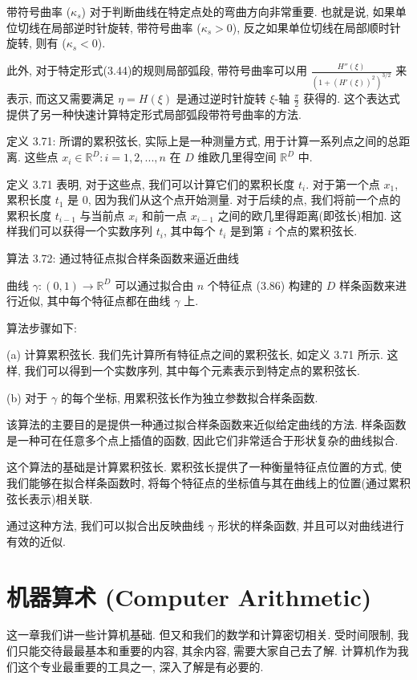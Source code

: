 \documentclass[a4paper]{ctexart}
\begin{document}
{带符号曲率 ($\kappa_s$) 对于判断曲线在特定点处的弯曲方向非常重要. 
也就是说, 如果单位切线在局部逆时针旋转, 带符号曲率 ($\kappa_s > 0$), 反之如果单位切线在局部顺时针旋转, 则有 ($\kappa_s < 0$).

此外, 对于特定形式(3.44)的规则局部弧段, 带符号曲率可以用 $\frac{H''(\xi)}{(1 + (H'(\xi))^2)^{3/2}}$ 来表示, 
而这又需要满足 $\eta = H(\xi)$ 是通过逆时针旋转 $\xi$-轴 $\frac{\pi}{2}$ 获得的. 
这个表达式提供了另一种快速计算特定形式局部弧段带符号曲率的方法.

定义 3.71: 所谓的累积弦长, 实际上是一种测量方式, 用于计算一系列点之间的总距离. 
这些点 ${x_i \in \mathbb{R}^D : i = 1, 2, . . . , n}$ 在 $D$ 维欧几里得空间 $\mathbb{R}^D$ 中. 

定义 3.71 表明, 对于这些点, 我们可以计算它们的累积长度 $t_i$. 
对于第一个点 $x_1$, 累积长度 $t_1$ 是 0, 因为我们从这个点开始测量. 
对于后续的点, 我们将前一个点的累积长度 $t_{i-1}$ 与当前点 $x_i$ 和前一点 $x_{i-1}$ 之间的欧几里得距离(即弦长)相加.
这样我们可以获得一个实数序列 $t_i$, 其中每个 $t_i$ 是到第 $i$ 个点的累积弦长.

算法 3.72: 通过特征点拟合样条函数来逼近曲线

曲线 $\gamma : (0, 1) \rightarrow \mathbb{R}^D$ 可以通过拟合由 $n$ 个特征点 (3.86) 构建的 $D$ 样条函数来进行近似, 
其中每个特征点都在曲线 $\gamma$ 上.

算法步骤如下:

(a) 计算累积弦长. 我们先计算所有特征点之间的累积弦长, 如定义 3.71 所示. 这样, 我们可以得到一个实数序列, 其中每个元素表示到特定点的累积弦长.

(b) 对于 $\gamma$ 的每个坐标, 用累积弦长作为独立参数拟合样条函数.

该算法的主要目的是提供一种通过拟合样条函数来近似给定曲线的方法. 
样条函数是一种可在任意多个点上插值的函数, 因此它们非常适合于形状复杂的曲线拟合.

这个算法的基础是计算累积弦长. 累积弦长提供了一种衡量特征点位置的方式, 使我们能够在拟合样条函数时, 
将每个特征点的坐标值与其在曲线上的位置(通过累积弦长表示)相关联.

通过这种方法, 我们可以拟合出反映曲线 $\gamma$ 形状的样条函数, 并且可以对曲线进行有效的近似.

\section{机器算术 (Computer Arithmetic)}

这一章我们讲一些计算机基础. 但又和我们的数学和计算密切相关.
受时间限制, 我们只能交待最最基本和重要的内容, 其余内容,
需要大家自己去了解. 计算机作为我们这个专业最重要的工具之一,
深入了解是有必要的.

}
\end{document}
